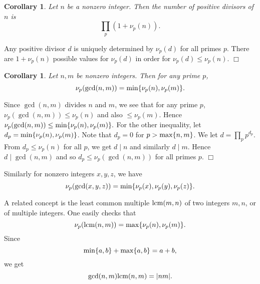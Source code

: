 \documentclass{article}
\def\lcm{{\rm lcm}}
\def\min{{\rm min}}
\def\max{{\rm max}}
\newtheorem{cor}[subsection]{Corollary}
\newenvironment{proof}{\noindent {\bf Proof:}}{$\Box$ \vspace{2 ex}}
\begin{document}
\begin{cor}
    Let $n$ be a nonzero integer. Then the number of positive divisors of $n$ is $$\prod_p (1 + \nu_p(n)).$$
\end{cor}

\begin{proof}
    Any positive divisor $d$ is uniquely determined by $\nu_p(d)$ for all primes $p$. There are $1+\nu_p(n)$ possible values for $\nu_p(d)$ in order for $\nu_p(d)\leq\nu_p(n)$.
\end{proof}

\begin{cor}
    Let $n,m$ be nonzero integers. Then for any prime $p$, $$\nu_p(\gcd(n,m)) = \min\{\nu_p(n),\nu_p(m)\}.$$
\end{cor}

\begin{proof}
    Since $\gcd(n,m)$ divides $n$ and $m$, we see that for any prime $p$, $\nu_p(\gcd(n,m))\leq\nu_p(n)$ and also $\leq\nu_p(m)$. Hence $\nu_p(\gcd(n,m)) \leq \min\{\nu_p(n),\nu_p(m)\}.$ For the other inequality, let $d_p = \min\{\nu_p(n),\nu_p(m)\}$. Note that $d_p = 0$ for $p>\max\{n,m\}$. We let $d = \prod_p p^{d_p}$. From $d_p\leq \nu_p(n)$ for all $p$, we get $d\mid n$ and similarly $d\mid m$. Hence $d\mid \gcd(n,m)$ and so $d_p\leq \nu_p(\gcd(n,m))$ for all primes $p$.
\end{proof}

Similarly for nonzero integers $x,y,z$, we have
$$\nu_p(\gcd(x,y,z)) = \min\{\nu_p(x),\nu_p(y),\nu_p(z)\}.$$

A related concept is the least common multiple $\lcm(m,n)$ of two integers $m,n$, or of multiple integers. One easily checks that $$\nu_p(\lcm(n,m)) = \max\{\nu_p(n),\nu_p(m)\}.$$
Since $$\min\{a,b\} + \max\{a,b\} = a + b,$$
we get $$\gcd(n,m)\lcm(n,m) = |nm|.$$
\end{document}
